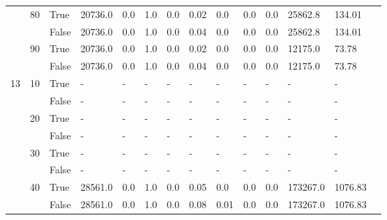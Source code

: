 \begin{landscape}
\begin{small}
\begin{longtable}[c]{@{}lll|ll|ll|ll|ll|lll@{}}
   & 80 & True  & 20736.0         & 0.0            & 1.0           & 0.0           & 0.02          & 0.0           & 0.0           & 0.0           & 25862.8       & 134.01      &  \\
   &    & False & 20736.0         & 0.0            & 1.0           & 0.0           & 0.04          & 0.0           & 0.0           & 0.0           & 25862.8       & 134.01      &  \\
   & 90 & True  & 20736.0         & 0.0            & 1.0           & 0.0           & 0.02          & 0.0           & 0.0           & 0.0           & 12175.0       & 73.78       &  \\
   &    & False & 20736.0         & 0.0            & 1.0           & 0.0           & 0.04          & 0.0           & 0.0           & 0.0           & 12175.0       & 73.78       &  \\
  \midrule
13 & 10 & True  & -               & -              & -             & -             & -             & -             & -             & -             & -             & -           &  \\
   &    & False & -               & -              & -             & -             & -             & -             & -             & -             & -             & -           &  \\
   & 20 & True  & -               & -              & -             & -             & -             & -             & -             & -             & -             & -           &  \\
   &    & False & -               & -              & -             & -             & -             & -             & -             & -             & -             & -           &  \\
   & 30 & True  & -               & -              & -             & -             & -             & -             & -             & -             & -             & -           &  \\
   &    & False & -               & -              & -             & -             & -             & -             & -             & -             & -             & -           &  \\
   & 40 & True  & 28561.0         & 0.0            & 1.0           & 0.0           & 0.05          & 0.0           & 0.0           & 0.0           & 173267.0      & 1076.83     &  \\
   &    & False & 28561.0         & 0.0            & 1.0           & 0.0           & 0.08          & 0.01          & 0.0           & 0.0           & 173267.0      & 1076.83     &  \\

\end{longtable}
\end{small}
\end{landscape}

